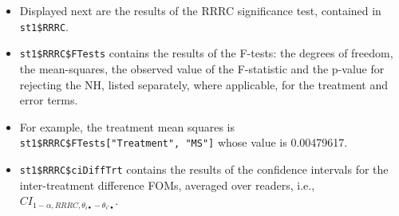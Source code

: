 \documentclass[
]{book}
\newenvironment{Shaded}{\begin{snugshade}}{\end{snugshade}}
\newcommand{\CommentTok}[1]{\textcolor[rgb]{0.56,0.35,0.01}{\textit{#1}}}
\newcommand{\DataTypeTok}[1]{\textcolor[rgb]{0.13,0.29,0.53}{#1}}
\newcommand{\DecValTok}[1]{\textcolor[rgb]{0.00,0.00,0.81}{#1}}
\newcommand{\KeywordTok}[1]{\textcolor[rgb]{0.13,0.29,0.53}{\textbf{#1}}}
\newcommand{\NormalTok}[1]{#1}
\newcommand{\OperatorTok}[1]{\textcolor[rgb]{0.81,0.36,0.00}{\textbf{#1}}}
\providecommand{\tightlist}{%
  \setlength{\itemsep}{0pt}\setlength{\parskip}{0pt}}
\begin{document}
\begin{itemize}
\tightlist
\item
  Displayed next are the results of the RRRC significance test, contained in \texttt{st1\$RRRC}.
\end{itemize}

\begin{Shaded}
\end{Shaded}

\begin{itemize}
\tightlist
\item
  \texttt{st1\$RRRC\$FTests} contains the results of the F-tests: the degrees of freedom, the mean-squares, the observed value of the F-statistic and the p-value for rejecting the NH, listed separately, where applicable, for the treatment and error terms.
\item
  For example, the treatment mean squares is \texttt{st1\$RRRC\$FTests{[}"Treatment",\ "MS"{]}} whose value is 0.00479617.
\end{itemize}

\begin{Shaded}
\end{Shaded}

\begin{itemize}
\tightlist
\item
  \texttt{st1\$RRRC\$ciDiffTrt} contains the results of the confidence intervals for the inter-treatment difference FOMs, averaged over readers, i.e., \(CI_{1-\alpha,RRRC,\theta_{i \bullet} - \theta_{i' \bullet}}\).
\end{itemize}

\begin{Shaded}
\end{Shaded}
\end{document}

